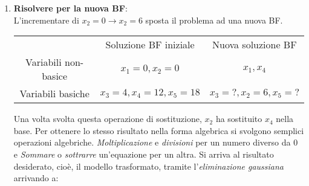\documentclass{article}
\begin{document}
\begin{tcolorbox}[
    colback=lightgray,
    colframe=black,
    coltext=black,
    title=Algebra dell'esempio del simplesso,
    colbacktitle=black,
    coltitle=lightgray,
    breakable
  ]
\begin{itemize}
\begin{enumerate}
                  Si vuole incrementare il più possibile il valore di un parametro ma rimanendo nella regione accettabile.
                  $$
                    \begin{cases}
                      Z = 3x_1 + 5x_2                        \\
                      x_1+x_3 =  4 \to x_3=4                 \\
                      2x_2 +x_4 =  12 \to x_4 = 12 - 2x_2    \\
                      3x_1+2x_2+x_5 = 18 \to x_5 = 18 - 2x_2 \\
                      x_1 \ge 0,
                      x_2 \ge 0,
                      x_3 \ge 0,
                      x_4 \ge 0,
                      x_5 \ge 0
                    \end{cases}
                  $$
                  Dal quale si estrapolano i vincoli:
                  $
                    \\
                    x_4=12-2x_2\ge 0 \Rightarrow x_2\le \frac{12}{2}=6 \\
                    x_5=18-2x\ge 0 \Rightarrow x_2 \le \frac{18}{2}=9
                  $
                  Porto $x_4$ a $0$ ottengo $x_2=6$ incrementarlo ulteriormente violerebbe i vincoli. Ci si riferisce a questi calcoli come \textbf{test di rateo minimo}. Quando una variabile viene portata "esce" dalla base e lascia entrare la variabile che viene incrementata.
            \item \textbf{Risolvere per la nuova BF}: \\
                  L'incrementare di $x_2=0\to x_2=6$ sposta il problema ad una nuova BF.
                  \begin{tabular}{ c c c }
                                         & Soluzione BF iniziale & Nuova soluzione BF    \\
                    Variabili non-basice & $x_1=0,x_2=0$         & $x_1,x_4$             \\
                    Variabili basiche    & $x_3=4,x_4=12,x_5=18$ & $x_3=?, x_2=6, x_5=?$
                  \end{tabular}
                  Una volta svolta questa operazione di sostituzione, $x_2$ ha sostituito $x_4$ nella base. Per ottenere lo stesso risultato nella forma algebrica si svolgono semplici operazioni algebriche. \textit{Moltiplicazione} e \textit{divisioni} per un numero diverso da $0$ e \textit{Sommare} o \textit{sottrarre} un'equazione per un altra. Si arriva al risultato desiderato, cioè, il modello trasformato, tramite l'\textit{eliminazione gaussiana} arrivando a:

\end{enumerate}
\end{itemize}
\end{tcolorbox}
\end{document}
